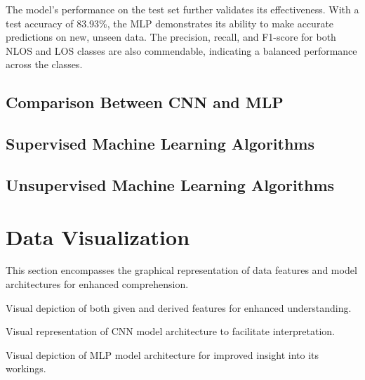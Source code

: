 \documentclass[
	a4paper, %
	11pt, %
]{CSUniSchoolLabReport}
\begin{document}
The model's performance on the test set further validates its effectiveness. With a test accuracy of 83.93\%, the MLP demonstrates its ability to make accurate predictions on new, unseen data. The precision, recall, and F1-score for both NLOS and LOS classes are also commendable, indicating a balanced performance across the classes.


\subsection{Comparison Between CNN and MLP}\label{cnn_vs_mlp}

\subsection{Supervised Machine Learning Algorithms}\label{sml}



\subsection{Unsupervised Machine Learning Algorithms}\label{uml}




\section{Data Visualization}\label{data_visualisation}

This section encompasses the graphical representation of data features and model architectures for enhanced comprehension.

\begin{description}[style=nextline]
    \item[Feature Visualization:] Visual depiction of both given and derived features for enhanced understanding.
    \item[Convolution Neural Network:] Visual representation of CNN model architecture to facilitate interpretation.
    \item[Multilayer Perceptron:] Visual depiction of MLP model architecture for improved insight into its workings.
\end{description}
\end{document}

